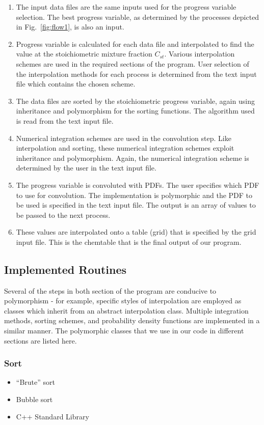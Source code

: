 \documentclass[11pt]{article}
\begin{document}
\begin{enumerate}
\item The input data files are the same inputs used for the progress
  variable selection. The best progress variable, as determined by the
  processes depicted in Fig.~\ref{fig:flow1}, is also an input.
\item Progress variable is calculated for each data file and
  interpolated to find the value at the stoichiometric mixture
  fraction $C_{st}$. Various interpolation schemes are used in the
  required sections of the program. User selection of the
  interpolation methods for each process is determined from the text
  input file which contains the chosen scheme.
\item The data files are sorted by the stoichiometric progress
  variable, again using inheritance and polymorphism for the sorting
  functions. The algorithm used is read from the text input file.
\item Numerical integration schemes are used in the convolution step.
  Like interpolation and sorting, these numerical integration schemes
  exploit inheritance and polymorphism. Again, the numerical
  integration scheme is determined by the user in the text input file.
\item The progress variable is convoluted with PDFs. The user
  specifies which PDF to use for convolution.  The implementation is
  polymorphic and the PDF to be used is specified in the text input
  file.  The output is an array of values to be passed to the next
  process.
\item These values are interpolated onto a table (grid) that is
  specified by the grid input file.  This is the chemtable that is the
  final output of our program.
\end{enumerate}

\subsection{Implemented Routines}
Several of the steps in both section of the program are conducive to
polymorphism - for example, specific styles of interpolation are
employed as classes which inherit from an abstract interpolation
class. Multiple integration methods, sorting schemes, and probability
density functions are implemented in a similar manner. The polymorphic
classes that we use in our code in different sections are listed here.

\subsubsection{Sort}
\begin{itemize}
\item “Brute” sort 
\item Bubble sort
\item C++ Standard Library
\end{itemize}
\end{document}
